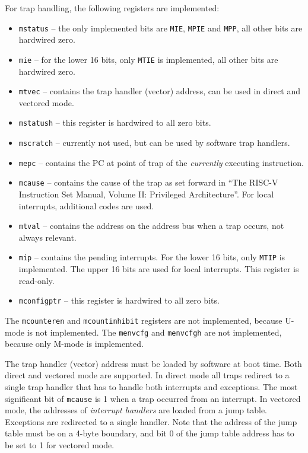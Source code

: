 \documentclass[12pt]{article}
\begin{document}
For trap handling, the following registers are implemented:

\begin{itemize}
\item \texttt{mstatus} -- the only implemented bits are \texttt{MIE}, \texttt{MPIE} and \texttt{MPP}, all other bits are hardwired zero.
\item \texttt{mie} -- for the lower 16 bits, only \texttt{MTIE} is implemented, all other bits are hardwired zero.
\item \texttt{mtvec} -- contains the trap handler (vector) address, can be used in direct and vectored mode.
\item \texttt{mstatush} -- this register is hardwired to all zero bits.
\item \texttt{mscratch} -- currently not used, but can be used by software trap handlers.
\item \texttt{mepc} -- contains the PC at point of trap of the \emph{currently} executing instruction.
\item \texttt{mcause} -- contains the cause of the trap as set forward in ``The RISC-V Instruction Set Manual, Volume II: Privileged Architecture''. For local interrupts, additional codes are used.
\item \texttt{mtval} -- contains the address on the address bus when a trap occurs, not always relevant.
\item \texttt{mip} -- contains the pending interrupts. For the lower 16 bits, only \texttt{MTIP} is implemented. The upper 16 bits are used for local interrupts. This register is read-only.
\item \texttt{mconfigptr} -- this register is hardwired to all zero bits.
\end{itemize}

The \texttt{mcounteren} and \texttt{mcountinhibit} registers are not implemented, because U-mode is not implemented. The \texttt{menvcfg} and \texttt{menvcfgh} are not implemented, because only M-mode is implemented.

The trap handler (vector) address must be loaded by software at boot time. Both direct and vectored mode are supported. In direct mode all traps redirect to a single trap handler that has to handle both interrupts and exceptions. The most significant bit of \texttt{mcause} is 1 when a trap occurred from an interrupt. In vectored mode, the addresses of \emph{interrupt handlers} are loaded from a jump table. Exceptions are redirected to a single handler. Note that the address of the jump table must be on a 4-byte boundary, and bit 0 of the jump table address has to be set to 1 for vectored mode.
\end{document}
